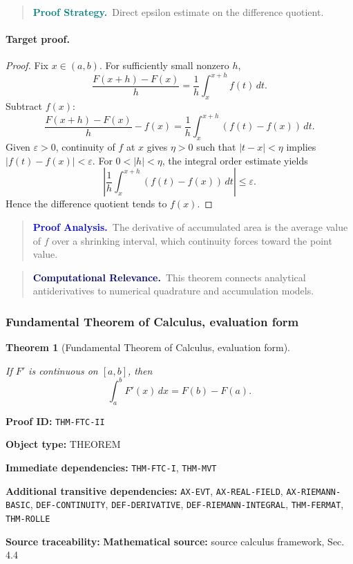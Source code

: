 \documentclass[10pt]{article}
\newcommand{\pidraw}[1]{\begingroup\urlstyle{tt}\nolinkurl{#1}\endgroup}
\newtheorem{theorem}{Theorem}[section]
\theoremstyle{definition}
\theoremstyle{remark}
\newenvironment{proofstrategy}
{\begin{quote}\small\noindent\textbf{\textcolor{teal}{Proof Strategy.}}\ }
{\end{quote}}
\newenvironment{proofanalysis}
{\begin{quote}\small\noindent\textbf{\textcolor{blue}{Proof Analysis.}}\ }
{\end{quote}}
\newenvironment{computationalrelevance}
{\begin{quote}\small\noindent\textbf{\textcolor{navy}{Computational Relevance.}}\ }
{\end{quote}}
\newcommand{\meta}[2]{\noindent\textbf{#1:} #2\par}
\begin{document}
\begin{proofstrategy}Direct epsilon estimate on the difference quotient.\end{proofstrategy}

\paragraph{Target proof.}

\begin{proof}

Fix $x\in(a,b)$. For sufficiently small nonzero $h$,
\[
\frac{F(x+h)-F(x)}{h}
=
\frac1h\int_x^{x+h}f(t)\,dt.
\]
Subtract $f(x)$:
\[
\frac{F(x+h)-F(x)}{h}-f(x)
=
\frac1h\int_x^{x+h}(f(t)-f(x))\,dt.
\]
Given $\varepsilon>0$, continuity of $f$ at $x$ gives $\eta>0$ such that
$|t-x|<\eta$ implies $|f(t)-f(x)|<\varepsilon$. For $0<|h|<\eta$, the
integral order estimate yields
\[
\left|
\frac1h\int_x^{x+h}(f(t)-f(x))\,dt
\right|
\le \varepsilon.
\]
Hence the difference quotient tends to $f(x)$.

\end{proof}

\begin{proofanalysis}The derivative of accumulated area is the average value of $f$ over a shrinking interval, which continuity forces toward the point value.\end{proofanalysis}

\begin{computationalrelevance}This theorem connects analytical antiderivatives to numerical quadrature and accumulation models.\end{computationalrelevance}

\subsubsection{Fundamental Theorem of Calculus, evaluation form}

\begin{theorem}[Fundamental Theorem of Calculus, evaluation form]\label{prf:THM-FTC-II}

If $F'$ is continuous on $[a,b]$, then
\[
\int_a^b F'(x)\,dx=F(b)-F(a).
\]

\end{theorem}

\meta{Proof ID}{\pidraw{THM-FTC-II}}
\meta{Object type}{THEOREM}
\meta{Immediate dependencies}{\pidraw{THM-FTC-I}, \pidraw{THM-MVT}}
\meta{Additional transitive dependencies}{\pidraw{AX-EVT}, \pidraw{AX-REAL-FIELD}, \pidraw{AX-RIEMANN-BASIC}, \pidraw{DEF-CONTINUITY}, \pidraw{DEF-DERIVATIVE}, \pidraw{DEF-RIEMANN-INTEGRAL}, \pidraw{THM-FERMAT}, \pidraw{THM-ROLLE}}
\meta{Source traceability}{\textbf{Mathematical source:} source calculus framework, Sec. 4.4}
\end{document}
